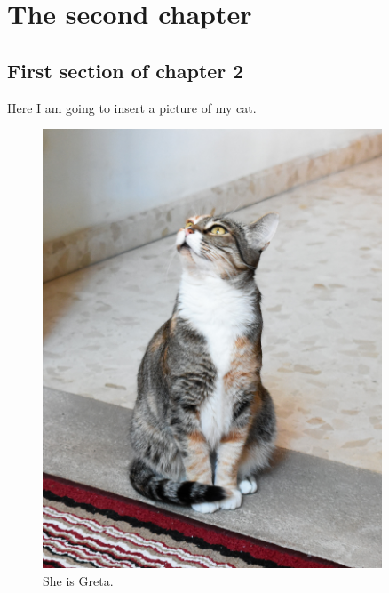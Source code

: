 \chapter[The second chapter]{\nohyphens{The second chapter}}\label{chap2}
{
\hypersetup{linkcolor=\linkColorTOC}
\minitoc
}
\newpage


\begin{refsegment}

\section{First section of chapter 2}\label{sec:chap2.sec1}

Here I am going to insert a picture of my cat.

\begin{figure}[H]
    \centering
    \includegraphics[width=0.9\textwidth]{./chapter_2/figures/Greta.jpg}
    \caption{She is Greta.}
    \label{fig:Greta}
\end{figure}


\end{refsegment}
